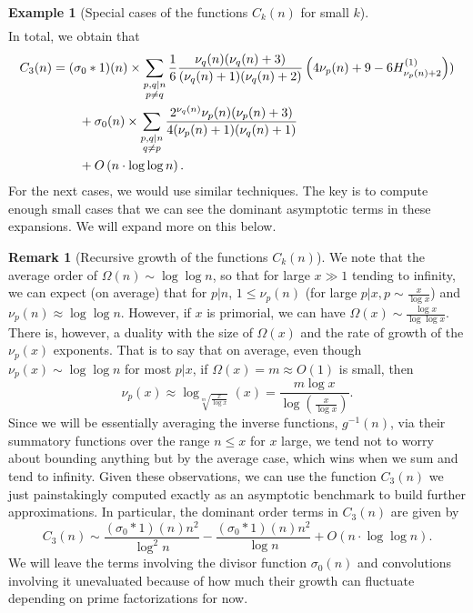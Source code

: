 \documentclass[11pt,reqno,a4letter]{article}
\numberwithin{figure}{section}
\numberwithin{table}{section}
\theoremstyle{plain}
\numberwithin{theorem}{section}
\theoremstyle{definition}
\newtheorem{example}[theorem]{Example}
\newtheorem{remark}[theorem]{Remark}
\begin{document}
\begin{example}[Special cases of the functions $C_k(n)$ for small $k$]
\begin{align*}
\end{align*} 
In total, we obtain that 
\begin{align} 
\label{eqn_ExactFormula_Ck3n} 
C_3(n) & = (\sigma_0 \ast 1)(n) \times \sum_{\substack{p,q|n \\ p \neq q}} 
     \frac{1}{6}\frac{\nu_q(n) (\nu_q(n) + 3)}{ 
     (\nu_q(n)+1)(\nu_q(n)+2)} \left(4\nu_p(n)+9-6 H_{\nu_p(n)+2}^{(1)}\right)) \\ 
\notag 
     & \phantom{= \quad\ } + 
     \sigma_0(n) \times \sum_{\substack{p,q|n \\ q \neq p}} 
     \frac{2^{\nu_q(n)} \nu_p(n) (\nu_p(n) + 3)}{4 (\nu_p(n) + 1) (\nu_q(n) + 1)} \\ 
\notag
     & \phantom{= \quad\ } + 
     O\left(n \cdot \log\log n\right). 
\end{align} 
For the next cases, we would use similar techniques. The key is to compute enough small cases that we can see 
the dominant asymptotic terms in these expansions. We will expand more on this below. 
\end{example}

\begin{remark}[Recursive growth of the functions $C_k(n)$]
We note that the average order of $\Omega(n) \sim \log\log n$, so that for large $x \gg 1$ tending to 
infinity, we can expect (on average) that for $p|n$, $1 \leq \nu_p(n)$ (for large $p|x, p \sim \frac{x}{\log x}$) 
and $\nu_p(n) \approx \log\log n$. However, if $x$ is primorial, we can have 
$\Omega(x) \sim \frac{\log x}{\log\log x}$. There is, however, a duality with the size of $\Omega(x)$ and the 
rate of growth of the $\nu_p(x)$ exponents. That is to say that on average, 
even though $\nu_p(x) \sim \log\log n$ for most $p|x$, if $\Omega(x) = m \approx O(1)$ is small, then 
\[
\nu_p(x) \approx \log_{\sqrt[m]{\frac{x}{\log x}}}(x) = \frac{m \log x}{\log\left(\frac{x}{\log x}\right)}. 
\]
Since we will be essentially averaging the inverse functions, $g^{-1}(n)$, via their summatory functions 
over the range $n \leq x$ for $x$ large, we tend not to worry about bounding anything but by the 
average case, which wins when we sum and tend to infinity. 
Given these observations, we can use the function $C_3(n)$ we just painstakingly computed exactly 
as an asymptotic benchmark to build further approximations. In particular, the dominant order terms in 
$C_3(n)$ are given by 
\[
C_3(n) \sim \frac{(\sigma_0 \ast 1)(n) n^2}{\log^2 n} - 
     \frac{(\sigma_0 \ast 1)(n) n^2}{\log n} + 
     O\left(n \cdot \log\log n\right). 
\]
We will leave the terms involving the divisor function $\sigma_0(n)$ and convolutions 
involving it unevaluated because of how much their growth can fluctuate depending on prime 
factorizations for now. 
\end{remark} 
\end{document}
